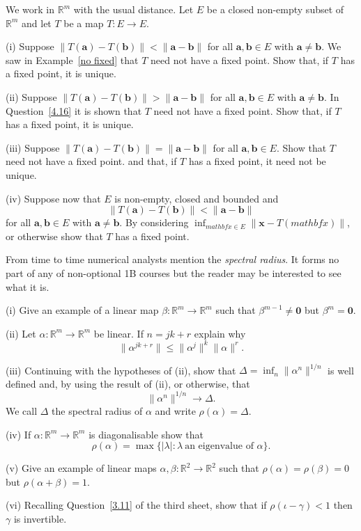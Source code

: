 \begin{question}
We work in ${\mathbb R}^{m}$ with the usual distance.
Let $E$ be a closed non-empty subset of ${\mathbb R}^{m}$
and let $T$ be a map $T:E\rightarrow E$.

(i) Suppose
$\|T({\mathbf a})-T({\mathbf b})\|<\|{\mathbf a}-{\mathbf b}\|$
for all ${\mathbf a},{\mathbf b}\in E$
with ${\mathbf a}\neq{\mathbf b}$. We saw in
Example~\ref{no fixed} that $T$ need not have a fixed point.
Show that, if $T$ has a fixed point, it is unique.

(ii) Suppose
$\|T({\mathbf a})-T({\mathbf b})\|>\|{\mathbf a}-{\mathbf b}\|$
for all ${\mathbf a},{\mathbf b}\in E$
with  ${\mathbf a}\neq{\mathbf b}$.
In Question~\ref{4.16} it is shown that $T$ need not have a fixed
point. Show
that, if $T$ has a fixed point, it is unique.

(iii) Suppose
$\|T({\mathbf a})-T({\mathbf b})\|=\|{\mathbf a}-{\mathbf b}\|$
for all ${\mathbf a},{\mathbf b}\in E$.
Show that $T$ need not have a fixed point.
and that, if $T$ has a fixed point, it need not be unique.

(iv) Suppose now that $E$ is non-empty, closed and bounded and
\[\|T({\mathbf a})-T({\mathbf b})\|<\|{\mathbf a}-{\mathbf b}\|\]
for all ${\mathbf a},{\mathbf b}\in E$
with ${\mathbf a}\neq{\mathbf b}$.
By considering $\inf_{{mathbf x}\in E}\|{\mathbf x}-T({mathbf x})\|$,
or otherwise
show that $T$ has a fixed point.


\end{question}
\begin{question}
From time to time numerical analysts mention
the \emph{spectral radius}. It forms no part of any
of non-optional 1B courses but the reader may be interested
to see what it is.

(i) Give an example of a linear map
$\beta:{\mathbb R}^{m}\rightarrow{\mathbb R}^{m}$
such that $\beta^{m-1}\neq {\mathbf 0}$ but
$\beta^{m}={\mathbf 0}$.

(ii) Let $\alpha:{\mathbb R}^{m}\rightarrow{\mathbb R}^{m}$
be linear.
If $n=jk+r$ explain why
\[\|\alpha^{jk+r}\|\leq \|\alpha^{j}\|^{k}\|\alpha\|^{r}.\]

(iii) Continuing with the hypotheses of (ii), show that
$\Delta=\inf_{n}\|\alpha^{n}\|^{1/n}$ is well defined
and, by using the result of (ii), or otherwise, that
\[\|\alpha^{n}\|^{1/n}\rightarrow \Delta.\]
We call $\Delta$ the spectral radius of $\alpha$
and write $\rho(\alpha)=\Delta$.

(iv) If $\alpha:{\mathbb R}^{m}\rightarrow{\mathbb R}^{m}$
is diagonalisable show that
\[\rho(\alpha)=\max\{|\lambda|:\lambda\ \text{an eigenvalue
of $\alpha$}\}.\]

(v) Give an example of linear maps
$\alpha,\beta:{\mathbb R}^{2}\rightarrow{\mathbb R}^{2}$
such that $\rho(\alpha)=\rho(\beta)=0$ but
$\rho(\alpha+\beta)=1$.

(vi) Recalling Question~\ref{3.11} of the third sheet, show that
if $\rho(\iota-\gamma)<1$ then $\gamma$ is invertible.


\end{question}

